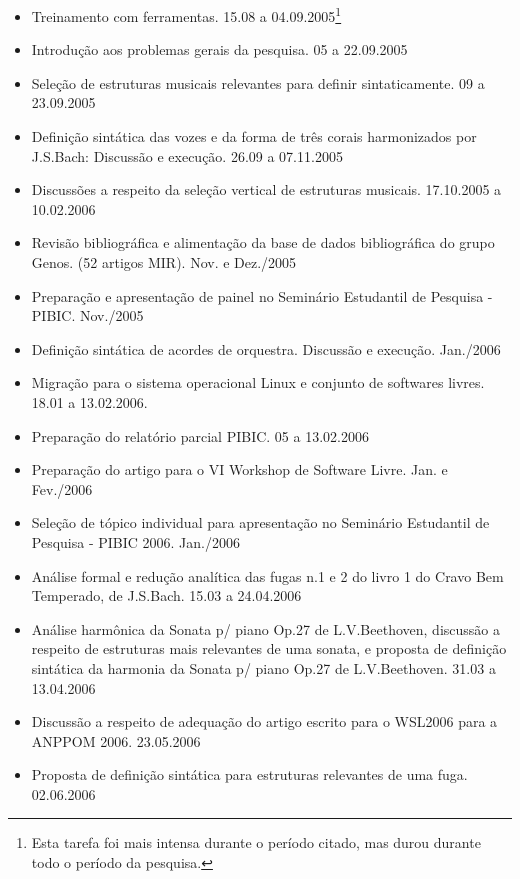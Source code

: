 \documentclass[11pt]{article}
\begin{document}
\label{sec:atividades}

\begin{itemize}
\item Treinamento com ferramentas. 15.08 a 04.09.2005\footnote{Esta
    tarefa foi mais intensa durante o período citado, mas durou
    durante todo o período da pesquisa.}
\item Introdução aos problemas gerais da pesquisa. 05 a 22.09.2005
\item Seleção de estruturas musicais relevantes para definir
  sintaticamente. 09 a 23.09.2005
\item Definição sintática das vozes e da forma de três corais
  harmonizados por J.S.Bach: Discussão e execução. 26.09 a 07.11.2005
\item Discussões a respeito da seleção vertical de estruturas
  musicais. 17.10.2005 a 10.02.2006
\item Revisão bibliográfica e alimentação da base de dados
  bibliográfica do grupo Genos. (52 artigos MIR). Nov. e Dez./2005
\item Preparação e apresentação de painel no Seminário Estudantil de
  Pesquisa - PIBIC. Nov./2005
\item Definição sintática de acordes de orquestra. Discussão e
  execução. Jan./2006
\item Migração para o sistema operacional Linux e conjunto de
  softwares livres. 18.01 a 13.02.2006.
\item Preparação do relatório parcial PIBIC. 05 a 13.02.2006
\item Preparação do artigo para o VI Workshop de Software
  Livre. Jan. e Fev./2006
\item Seleção de tópico individual para apresentação no Seminário
  Estudantil de Pesquisa - PIBIC 2006. Jan./2006
\item Análise formal e redução analítica das fugas n.1 e 2 do livro 1
  do Cravo Bem Temperado, de J.S.Bach. 15.03 a 24.04.2006
\item Análise harmônica da Sonata p/ piano Op.27 de L.V.Beethoven,
  discussão a respeito de estruturas mais relevantes de uma sonata, e
  proposta de definição sintática da harmonia da Sonata p/ piano Op.27
  de L.V.Beethoven.  31.03 a 13.04.2006
\item Discussão a respeito de adequação do artigo escrito para o
  WSL2006 para a ANPPOM 2006. 23.05.2006
\item Proposta de definição sintática para estruturas relevantes de
  uma fuga. 02.06.2006
\end{itemize}
\end{document}
